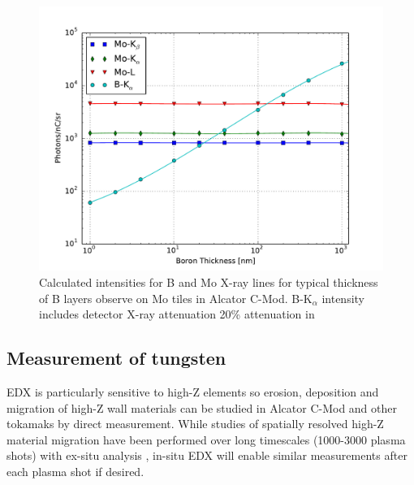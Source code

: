 \documentclass[12pt,letterpaper,final]{article}
\begin{document}
\begin{figure}[!h]
 \centering
  \includegraphics[width=\columnwidth]{figures/cModApplications/Boron_XRayIntensities.pdf}
 \caption{Calculated intensities for B and Mo X-ray lines for typical thickness of B layers observe on Mo tiles in Alcator C-Mod. B-K$_\alpha$ intensity includes detector X-ray attenuation 20\% attenuation in }
 \label{fig:BoronIntensity}
\end{figure}

\subsection{Measurement of tungsten}
\label{sec:ApplicationsTungsten}
EDX is particularly sensitive to high-Z elements so erosion, deposition and migration of high-Z wall materials can be studied in Alcator C-Mod and other tokamaks by direct measurement. While studies of spatially resolved high-Z material migration have been performed over long timescales (1000-3000 plasma shots) with ex-situ analysis \cite{barnard2011study,Wampler}, in-situ EDX will enable similar measurements after each plasma shot if desired.
\end{document}
